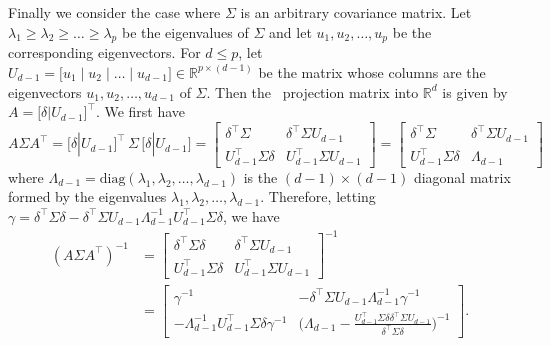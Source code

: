 \documentclass[10pt]{article}
\begin{document}
Finally we consider the case where $\Sigma$ is an arbitrary covariance matrix. Let $\lambda_1 \geq \lambda_2 \geq \dots \geq \lambda_{p}$ be the eigenvalues of $\Sigma$ and let $u_1, u_2, \dots, u_p$ be the corresponding eigenvectors. For $d \leq p$,  let $U_{d-1} = \bigl[ u_1 \mid u_2 \mid \dots \mid u_{d-1}] \in \mathbb{R}^{p \times (d-1)}$ be the matrix whose columns are the eigenvectors $u_1, u_2, \dots, u_{d-1}$ of $\Sigma$. Then the \Lol~projection matrix into $\mathbb{R}^{d}$ is given by $A = \bigl[ \delta | U_{d-1} \bigr]^{\top}$. We first have
\begin{equation*}
A \Sigma A^{\top} = \bigl[ \delta | U_{d-1} \bigr]^{\top}\, \Sigma \, \bigl[ \delta | U_{d-1} \bigr] = \begin{bmatrix} \delta^{\top} \Sigma & \delta^{\top} \Sigma U_{d-1} \\ U_{d-1}^{\top} \Sigma \delta & U_{d-1}^{\top} \Sigma U_{d-1} \end{bmatrix} = \begin{bmatrix} \delta^{\top} \Sigma & \delta^{\top} \Sigma U_{d-1} \\ U_{d-1}^{\top} \Sigma \delta & \Lambda_{d-1} \end{bmatrix}
\end{equation*}
where $\Lambda_{d-1} = \mathrm{diag}(\lambda_1, \lambda_2, \dots, \lambda_{d-1})$ is the $(d-1) \times (d-1)$ diagonal matrix formed by the eigenvalues $\lambda_1, \lambda_2, \dots, \lambda_{d-1}$.
Therefore, letting $\gamma = \delta^{\top} \Sigma \delta - \delta^{\top} \Sigma U_{d-1} \Lambda_{d-1}^{-1} U_{d-1}^{\top} \Sigma \delta$, we have
\begin{equation*}
\begin{split}
(A \Sigma A^{\top})^{-1} &= \begin{bmatrix} \delta^{\top} \Sigma \delta & \delta^{\top} \Sigma U_{d-1} \\ U_{d-1}^{\top} \Sigma \delta & U_{d-1}^{\top} \Sigma U_{d-1} \end{bmatrix}^{-1} \\
&= \begin{bmatrix} \gamma^{-1} & - \delta^{\top} \Sigma U_{d-1} \Lambda_{d-1}^{-1} \gamma^{-1} \\
- \Lambda_{d-1}^{-1} U_{d-1}^{\top} \Sigma \delta \gamma^{-1} & \bigl(\Lambda_{d-1} - \frac{U_{d-1}^{\top} \Sigma \delta \delta^{\top} \Sigma U_{d-1}}{\delta^{\top} \Sigma \delta} \bigr)^{-1} \end{bmatrix}.
\end{split}
\end{equation*}
\end{document}
